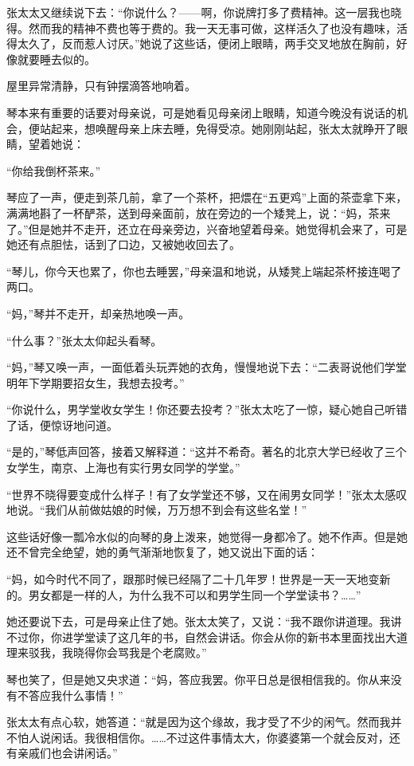 \par 张太太又继续说下去：“你说什么？——啊，你说牌打多了费精神。这一层我也晓得。然而我的精神不费也等于费的。我一天无事可做，这样活久了也没有趣味，活得太久了，反而惹人讨厌。”她说了这些话，便闭上眼睛，两手交叉地放在胸前，好像就要睡去似的。
\par 屋里异常清静，只有钟摆滴答地响着。
\par 琴本来有重要的话要对母亲说，可是她看见母亲闭上眼睛，知道今晚没有说话的机会，便站起来，想唤醒母亲上床去睡，免得受凉。她刚刚站起，张太太就睁开了眼睛，望着她说：
\par “你给我倒杯茶来。”
\par 琴应了一声，便走到茶几前，拿了一个茶杯，把煨在“五更鸡”上面的茶壶拿下来，满满地斟了一杯酽茶，送到母亲面前，放在旁边的一个矮凳上，说：“妈，茶来了。”但是她并不走开，还立在母亲旁边，兴奋地望着母亲。她觉得机会来了，可是她还有点胆怯，话到了口边，又被她收回去了。
\par “琴儿，你今天也累了，你也去睡罢，”母亲温和地说，从矮凳上端起茶杯接连喝了两口。
\par “妈，”琴并不走开，却亲热地唤一声。
\par “什么事？”张太太仰起头看琴。
\par “妈，”琴又唤一声，一面低着头玩弄她的衣角，慢慢地说下去：“二表哥说他们学堂明年下学期要招女生，我想去投考。”
\par “你说什么，男学堂收女学生！你还要去投考？”张太太吃了一惊，疑心她自己听错了话，便惊讶地问道。
\par “是的，”琴低声回答，接着又解释道：“这并不希奇。著名的北京大学已经收了三个女学生，南京、上海也有实行男女同学的学堂。”
\par “世界不晓得要变成什么样子！有了女学堂还不够，又在闹男女同学！”张太太感叹地说。“我们从前做姑娘的时候，万万想不到会有这些名堂！”
\par 这些话好像一瓢冷水似的向琴的身上泼来，她觉得一身都冷了。她不作声。但是她还不曾完全绝望，她的勇气渐渐地恢复了，她又说出下面的话：
\par “妈，如今时代不同了，跟那时候已经隔了二十几年罗！世界是一天一天地变新的。男女都是一样的人，为什么我不可以和男学生同一个学堂读书？……”
\par 她还要说下去，可是母亲止住了她。张太太笑了，又说：“我不跟你讲道理。我讲不过你，你进学堂读了这几年的书，自然会讲话。你会从你的新书本里面找出大道理来驳我，我晓得你会骂我是个老腐败。”
\par 琴也笑了，但是她又央求道：“妈，答应我罢。你平日总是很相信我的。你从来没有不答应我什么事情！”
\par 张太太有点心软，她答道：“就是因为这个缘故，我才受了不少的闲气。然而我并不怕人说闲话。我很相信你。……不过这件事情太大，你婆婆第一个就会反对，还有亲戚们也会讲闲话。”
